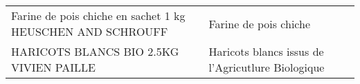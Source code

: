 \begin{longtable}{p{5cm}p{10cm}}
                                               Farine de pois chiche en sachet 1 kg HEUSCHEN AND SCHROUFF &                                                                                                                                                                                                                                                                                                                                                                                                                                                                                                                                                                                                                                                                                                                                                                                                                                                                                                                                                                                                                    Farine de pois chiche \\
                                                                  HARICOTS BLANCS BIO 2.5KG VIVIEN PAILLE &                                                                                                                                                                                                                                                                                                                                                                                                                                                                                                                                                                                                                                                                                                                                                                                                                                                                                                                                                                                        Haricots blancs issus de l'Agricutlure Biologique \\

\end{longtable}
